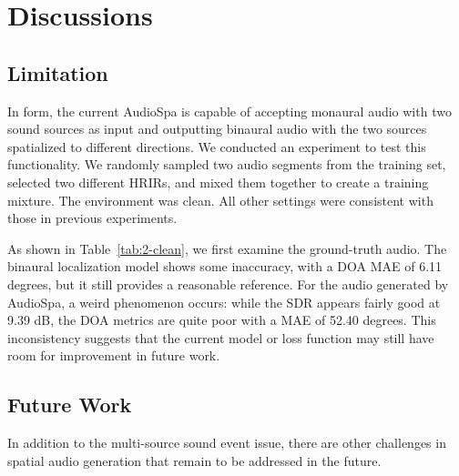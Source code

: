 \documentclass{IEEEtran}
\begin{document}
\section{Discussions}\label{sec:dis}

\subsection{Limitation}

\begin{table}[t]
    \centering
    \caption{Results on the two-source data, where the environment is clean.}
    \label{tab:2-clean}%
  \end{table}%

In form, the current AudioSpa is capable of accepting monaural audio with two sound sources as input and outputting binaural audio with the two sources spatialized to different directions. We conducted an experiment to test this functionality. We randomly sampled two audio segments from the training set, selected two different HRIRs, and mixed them together to create a training mixture. The environment was clean. All other settings were consistent with those in previous experiments.

As shown in Table~\ref{tab:2-clean}, we first examine the ground-truth audio. The binaural localization model shows some inaccuracy, with a DOA MAE of 6.11 degrees, but it still provides a reasonable reference. For the audio generated by AudioSpa, a weird phenomenon occurs: while the SDR appears fairly good at 9.39 dB, the DOA metrics are quite poor with a MAE of 52.40 degrees. This inconsistency suggests that the current model or loss function may still have room for improvement in future work.

\subsection{Future Work}
In addition to the multi-source sound event issue, there are other challenges in spatial audio generation that remain to be addressed in the future.
\end{document}
